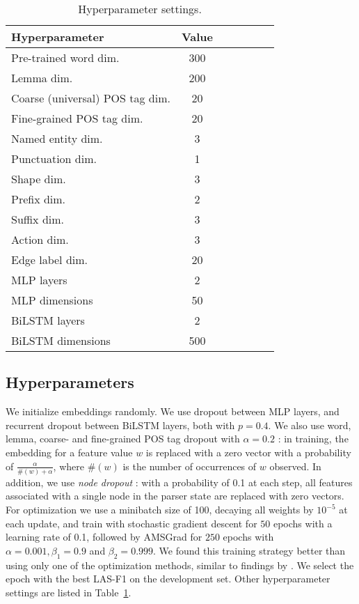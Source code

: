\documentclass[11pt,a4paper]{article}
\begin{document}
\begin{table}[h]
\centering
\begin{tabular}{l|c|ccccc}
\hline
\bf Hyperparameter &  \bf Value \\
\hline
Pre-trained word dim. & 300 \\
Lemma dim. & 200 \\
Coarse (universal) POS tag dim. & 20 \\
Fine-grained POS tag dim. & 20 \\
Named entity dim. & 3 \\
Punctuation dim. & 1 \\
Shape dim. & 3 \\
Prefix dim. & 2 \\
Suffix dim. & 3 \\
Action dim. & 3 \\
Edge label dim. & 20 \\
\hline
MLP layers & 2 \\
MLP dimensions & 50 \\
BiLSTM layers & 2 & \\
BiLSTM dimensions & 500
\end{tabular}
\caption{Hyperparameter settings.\label{tab:hyperparams}}
\end{table}


\subsection{Hyperparameters}

We initialize embeddings randomly.
We use dropout \cite{srivastava2014dropout} between MLP layers, and recurrent dropout
\cite{NIPS2016_6241} between BiLSTM layers, both with $p=0.4$.
We also use word, lemma, coarse- and fine-grained POS tag dropout
with $\alpha=0.2$
\cite{kiperwasser2016simple}: in training, the embedding for a feature value
$w$ is replaced with a zero vector with a probability of
$\frac{\alpha}{\#(w)+\alpha}$,
where $\#(w)$ is the number of occurrences of $w$ observed.
In addition, we use \textit{node dropout} \cite{hershcovich2018multitask}:
with a probability of 0.1 at each step, all features associated with a single
node in the parser state are replaced with zero vectors.
For optimization we use a minibatch size of 100, decaying all weights by $10^{-5}$ at each update,
and train with stochastic gradient descent for $50$ epochs with a learning
rate of 0.1, followed by AMSGrad \cite{j.2018on} for $250$ epochs with
$\alpha=0.001,\beta_1=0.9$ and $\beta_2=0.999$.
We found this training strategy better than using only one of the optimization methods,
similar to findings by \citet{keskar2017improving}.
We select the epoch with the best LAS-F1 on the
development set.
Other hyperparameter settings are listed in Table~\ref{tab:hyperparams}.
\end{document}
